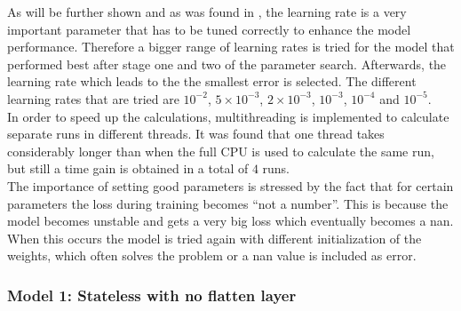 As will be further shown and as was found in \cite{Greff2017}, the learning rate is a very important parameter that has to be tuned correctly to enhance the model performance. Therefore a bigger range of learning rates is tried for the model that performed best after stage one and two of the parameter search. Afterwards, the learning rate which leads to the the smallest error is selected. The different learning rates that are tried are $ 10^{-2} $, $ 5\times10^{-3} $, $ 2\times10^{-3} $, $ 10^{-3} $, $ 10^{-4} $ and $ 10^{-5} $. \\

In order to speed up the calculations, multithreading is implemented to calculate separate runs in different threads. It was found that one thread takes considerably longer than when the full CPU is used to calculate the same run, but still a time gain is obtained in a total of $ 4 $ runs.\\

The importance of setting good parameters is stressed by the fact that for certain parameters the loss during training becomes ``not a number''. This is because the model becomes unstable and gets a very big loss which eventually becomes a nan. When this occurs the model is tried again with different initialization of the weights, which often solves the problem or a nan value is included as error. 


\subsubsection{Model 1: Stateless with no flatten layer}

